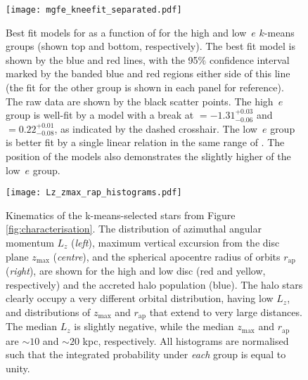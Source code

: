 \begin{figure}
\texttt{[image: mgfe\_kneefit\_separated.pdf]}
\caption[Best fit models for the \mgfe{} as a function of \feh{} for the low and high $e$ groups, showing the change of slope in \mgfe{}-\feh{} for the high $e$ population]{\label{fig:mgknee} Best fit models for \mgfe{} as a
function of \feh{} for the high and low~$e$ $k$-means groups (shown
top and bottom, respectively). The best fit model is shown by the
blue and red lines, with the 95$\%$ confidence interval marked by
the banded blue and red regions either side of this line (the fit
for the other group is shown in each panel for reference). The raw
data are shown by the black scatter points. The high~$e$ group is
well-fit by a model with a break at \feh{}$=-1.31^{+0.03}_{-0.06}$
and \mgfe{}$=0.22^{+0.01}_{-0.08}$, as indicated by the dashed
crosshair. The low~$e$ group is better fit by a single linear
relation in the same range of \feh{}. The position of the models
also demonstrates the slightly higher \mgfe{} of the low~$e$ group.}
\end{figure}


\begin{figure*}
\texttt{[image: Lz\_zmax\_rap\_histograms.pdf]} 
\caption[Angular momentum, $z_\mathrm{max}$ and $r_\mathrm{ap}$ distributions of the $k$-means groups]{\label{fig:kinematics} Kinematics of the k-means-selected
stars from Figure \ref{fig:characterisation}. The distribution
of azimuthal angular momentum $L_z$ (\emph{left}), maximum vertical
excursion from the disc plane $z_\mathrm{max}$ (\emph{centre}), and
the spherical apocentre radius of orbits $r_\mathrm{ap}$ (\emph{right}),
are shown for the high and low \afe{} disc (red and yellow, respectively)
and the accreted halo population (blue). The halo stars clearly
occupy a very different orbital distribution, having low $L_z$, and
distributions of $z_\mathrm{max}$ and $r_\mathrm{ap}$ that extend
to very large distances. The median $L_z$ is slightly negative,
while the median $z_\mathrm{max}$ and $r_\mathrm{ap}$ are $\sim10$
and $\sim 20$ kpc, respectively. All histograms are normalised such
that the integrated probability under \emph{each} group is equal to
unity.}
\end{figure*}


